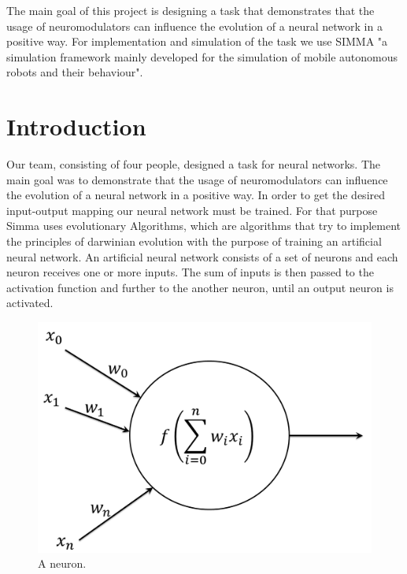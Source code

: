 \documentclass[12pt,fleqn,a4paper]{article}
\begin{document}
\clearpage
\pagestyle{headings}
\setcounter{page}{1}
\setcounter{page}{1}

\tableofcontents
\newpage

\abstract
{The main goal of this project is designing a task that demonstrates that the usage of neuromodulators can influence the evolution of a neural network in a positive way. For implementation and simulation of the task we use SIMMA "a simulation framework mainly developed for the simulation of mobile autonomous robots and their behaviour".}

\section{Introduction}
Our team, consisting of four people, designed a task for neural networks.  The main goal was to demonstrate that the usage of neuromodulators can influence the evolution of a neural network in a positive way.
In order to get the desired input-output mapping our neural network must be trained.
For that purpose Simma uses evolutionary Algorithms, which are algorithms that try to implement the principles of darwinian evolution with the purpose of training an artificial neural network. An artificial neural network consists of a set of neurons and each neuron receives one or more inputs. The sum of inputs is then passed to the activation function and further to the another neuron, until an output neuron is activated.

\begin{figure}[h]
\centering
\includegraphics[scale=0.3]{img/neuron.png}
\caption{A neuron.}
\label{fig:neuron}
\end{figure}
\end{document}
